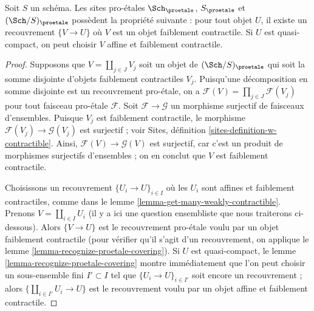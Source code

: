 \begin{lemma}
\label{lemma-weakly-contractible-cover}
Soit $S$ un schéma. Les sites pro-\'etales
$\Sch_\proetale$, $S_\proetale$ et $(\Sch/S)_\proetale$
possèdent la propriété suivante : pour tout objet
$U$, il existe un recouvrement $\{V \to U\}$ où $V$ est un
objet faiblement contractile. Si $U$ est quasi-compact, on peut
choisir $V$ affine et faiblement contractile.
\end{lemma}

\begin{proof}
Supposons que $V = \coprod_{j \in J} V_j$ soit un objet de $(\Sch/S)_\proetale$
qui soit la somme disjointe d'objets faiblement contractiles $V_j$.
Puisqu'une décomposition en somme disjointe est un recouvrement pro-\'etale,
on a $\mathcal{F}(V) = \prod_{j \in J} \mathcal{F}(V_j)$ pour tout
faisceau pro-\'etale $\mathcal{F}$. Soit $\mathcal{F} \to \mathcal{G}$
un morphisme surjectif de faisceaux d'ensembles. Puisque $V_j$ est faiblement contractile,
le morphisme $\mathcal{F}(V_j) \to \mathcal{G}(V_j)$ est surjectif ; voir
Sites, définition \ref{sites-definition-w-contractible}.
Ainsi, $\mathcal{F}(V) \to \mathcal{G}(V)$ est surjectif, car c'est un produit
de morphismes surjectifs d'ensembles ; on en conclut que $V$ est faiblement contractile.

\medskip\noindent
Choisissons un recouvrement $\{U_i \to U\}_{i \in I}$ où les $U_i$ sont affines et
faiblement contractiles, comme dans le lemme \ref{lemma-get-many-weakly-contractible}.
Prenons $V = \coprod_{i \in I} U_i$ (il y a ici une question ensembliste
que nous traiterons ci-dessous). Alors $\{V \to U\}$ est le recouvrement
pro-\'etale voulu par un objet faiblement contractile
(pour vérifier qu'il s'agit d'un recouvrement, on applique le
lemme \ref{lemma-recognize-proetale-covering}).
Si $U$ est quasi-compact, le
lemme \ref{lemma-recognize-proetale-covering}
montre immédiatement que l'on peut choisir un sous-ensemble fini $I' \subset I$ tel que
$\{U_i \to U\}_{i \in I'}$ soit encore un recouvrement ;
alors $\{\coprod_{i \in I'} U_i \to U\}$ est le recouvrement voulu
par un objet affine et faiblement contractile.


\end{proof}
